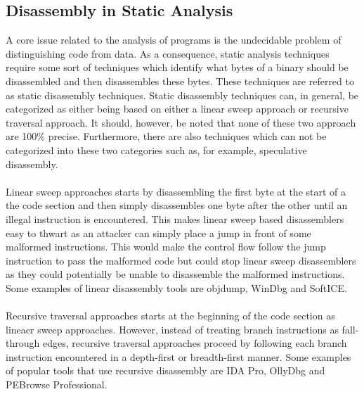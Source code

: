 \documentclass{kththesis}
\begin{document}
\subsection{Disassembly in Static Analysis}
A core issue related to the analysis of programs is the undecidable problem of distinguishing code from data\cite{ABinaryRewriting}. As a consequence, static analysis techniques require some sort of techniques which identify what bytes of a binary should be disassembled and then disassembles these bytes. These techniques are referred to as static disassembly techniques. Static disassembly techniques can, in general, be categorized as either being based on either a linear sweep approach or recursive traversal approach\cite{DisassemblyOfExecutable}. It should, however, be noted that none of these two approach are 100\% precise\cite{ABinaryRewriting}. Furthermore, there are also techniques which can not be categorized into these two categories such as, for example, speculative disassembly\cite{preciseCFG}.
\\ \\
Linear sweep approaches starts by disassembling the first byte at the start of a the code section and then simply disassembles one byte after the other until an illegal instruction is encountered\cite{ABinaryRewriting}. This makes linear sweep based disassemblers easy to thwart as an attacker can simply place a jump in front of some malformed instructions. This would make the control flow follow the jump instruction to pass the malformed code but could stop linear sweep disassemblers as they could potentially be unable to disassemble the malformed instructions\cite{ABinaryRewriting}. Some examples of linear disassembly tools are objdump, WinDbg and SoftICE\cite{ReversingSecretsofReverseEngineering}.
\\ \\ 
Recursive traversal approaches starts at the beginning of the code section as lineaer sweep approaches. However, instead of treating branch instructions as fall-through edges, recursive traversal approaches proceed by following each branch instruction encountered in a depth-first or breadth-first manner. Some examples of popular tools that use recursive disassembly are IDA Pro, OllyDbg and PEBrowse Professional\cite{ReversingSecretsofReverseEngineering}.

\end{document}
